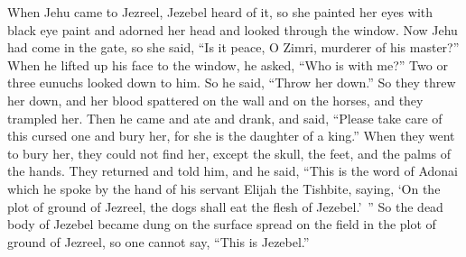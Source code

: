 \begin{biblechapter}
 When Jehu came to Jezreel, Jezebel heard of it, so she painted her eyes with black eye paint and adorned her head and looked through the window.
\verse Now Jehu had come in the gate, so she said, “Is it peace, O Zimri, murderer of his master?”
\verse When he lifted up his face to the window, he asked, “Who is with me?” Two or three eunuchs looked down to him.
\verse So he said, “Throw her down.” So they threw her down, and her blood spattered on the wall and on the horses, and they trampled her.
\verse Then he came and ate and drank, and said, “Please take care of this cursed one and bury her, for she is the daughter of a king.”
\verse When they went to bury her, they could not find her, except the skull, the feet, and the palms of the hands.
\verse They returned and told him, and he said, “This is the word of Adonai which he spoke by the hand of his servant Elijah the Tishbite, saying, ‘On the plot of ground of Jezreel, the dogs shall eat the flesh of Jezebel.’ ”
\verse So the dead body of Jezebel became dung on the surface spread on the field in the plot of ground of Jezreel, so one cannot say, “This is Jezebel.”
\end{biblechapter}

